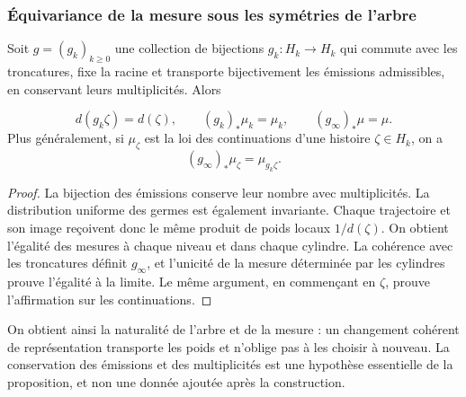 \subsubsection{Équivariance de la mesure sous les symétries de l'arbre}
\label{act21:sec:ch-naturalidad-medida}

\begin{proposition}
\label{act21:prop:ch-naturalidad-medida}
Soit \(g=(g_k)_{k\geq0}\) une collection de bijections \(g_k:H_k\to H_k\)
qui commute avec les troncatures, fixe la racine et transporte bijectivement
les émissions admissibles, en conservant leurs multiplicités. Alors

\[
 d(g_k\zeta)=d(\zeta),\qquad
 (g_k)_*\mu_k=\mu_k,\qquad (g_\infty)_*\mu=\mu.
\]
Plus généralement, si \(\mu_\zeta\) est la loi des continuations d'une
histoire \(\zeta\in H_k\), on a
\[
 (g_\infty)_*\mu_\zeta=\mu_{g_k\zeta}.
\]
\end{proposition}

\begin{proof}
La bijection des émissions conserve leur nombre avec multiplicités. La
distribution uniforme des germes est également invariante. Chaque trajectoire
et son image reçoivent donc le même produit de poids locaux
\(1/d(\zeta)\). On obtient l'égalité des mesures à chaque niveau et dans
chaque cylindre. La cohérence avec les troncatures définit \(g_\infty\),
et l'unicité de la mesure déterminée par les cylindres prouve l'égalité
à la limite. Le même argument, en commençant en \(\zeta\), prouve
l'affirmation sur les continuations.
\end{proof}

On obtient ainsi la naturalité de l'arbre et de la mesure : un changement cohérent
de représentation transporte les poids et n'oblige pas à les choisir à nouveau.
La conservation des émissions et des multiplicités est une hypothèse essentielle de
la proposition, et non une donnée ajoutée après la construction.
